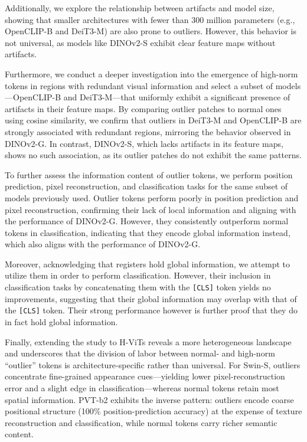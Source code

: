 \documentclass[10pt]{article} \usepackage[preprint]{tmlr}
\begin{document}
Additionally, we explore the relationship between artifacts and model size, showing that smaller architectures with fewer than 300 million parameters (e.g., OpenCLIP-B and DeiT3-M) are also prone to outliers. However, this behavior is not universal, as models like DINOv2-S exhibit clear feature maps without artifacts.

Furthermore, we conduct a deeper investigation into the emergence of high-norm tokens in regions with redundant visual information and select a subset of models—OpenCLIP-B and DeiT3-M—that uniformly exhibit a significant presence of artifacts in their feature maps. By comparing outlier patches to normal ones using cosine similarity, we confirm that outliers in DeiT3-M and OpenCLIP-B are strongly associated with redundant regions, mirroring the behavior observed in DINOv2-G. In contrast, DINOv2-S, which lacks artifacts in its feature maps, shows no such association, as its outlier patches do not exhibit the same patterns. 

To further assess the information content of outlier tokens, we perform position prediction, pixel reconstruction, and classification tasks for the same subset of models previously used. Outlier tokens perform poorly in position prediction and pixel reconstruction, confirming their lack of local information and aligning with the performance of DINOv2-G. However, they consistently outperform normal tokens in classification, indicating that they encode global information instead, which also aligns with the performance of DINOv2-G.

Moreover, acknowledging that registers hold global information, we attempt to utilize them in order to perform classification. However, their inclusion in classification tasks by concatenating them with the \texttt{[CLS]} token yields no improvements, suggesting that their global information may overlap with that of the \texttt{[CLS]} token. Their strong performance however is further proof that they do in fact hold global information.

Finally, extending the study to H-ViTs reveals a more heterogeneous landscape and underscores that the division of labor between normal‐ and high-norm “outlier” tokens is architecture-specific rather than universal.
For Swin-S, outliers concentrate fine-grained appearance cues—yielding lower pixel-reconstruction error and a slight edge in classification—whereas normal tokens retain most spatial information.
PVT-b2 exhibits the inverse pattern: outliers encode coarse positional structure (100\% position-prediction accuracy) at the expense of texture reconstruction and classification, while normal tokens carry richer semantic content.
\end{document}

